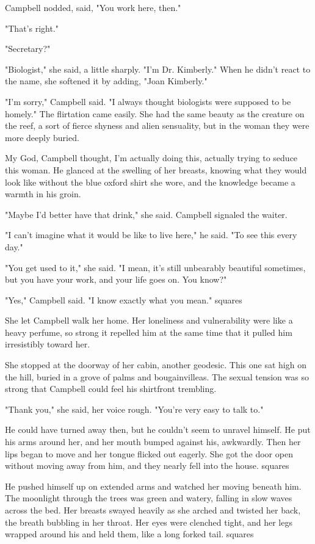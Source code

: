 Campbell nodded, said, "You work here, then."

"That's right."

"Secretary?"

"Biologist," she said, a little sharply. "I'm Dr. Kimberly." When he didn't react to the name, she softened it by adding, "Joan Kimberly."

"I'm sorry," Campbell said. "I always thought biologists were supposed to be homely." The flirtation came easily. She had the same beauty as the creature on the reef, a sort of fierce shyness and alien sensuality, but in the woman they were more deeply buried.

My God, Campbell thought, I'm actually doing this, actually trying to seduce this woman. He glanced at the swelling of her breasts, knowing what they would look like without the blue oxford shirt she wore, and the knowledge became a warmth in his groin.

"Maybe I'd better have that drink," she said. Campbell signaled the waiter.

"I can't imagine what it would be like to live here," he said. "To see this every day."

"You get used to it," she said. "I mean, it's still unbearably beautiful sometimes, but you have your work, and your life goes on. You know?"

"Yes," Campbell said. "I know exactly what you mean."
squares

She let Campbell walk her home. Her loneliness and vulnerability were like a heavy perfume, so strong it repelled him at the same time that it pulled him irresistibly toward her.

She stopped at the doorway of her cabin, another geodesic. This one sat high on the hill, buried in a grove of palms and bougainvilleas. The sexual tension was so strong that Campbell could feel his shirtfront trembling.

"Thank you," she said, her voice rough. "You're very easy to talk to."

He could have turned away then, but he couldn't seem to unravel himself. He put his arms around her, and her mouth bumped against his, awkwardly. Then her lips began to move and her tongue flicked out eagerly. She got the door open without moving away from him, and they nearly fell into the house.
squares

He pushed himself up on extended arms and watched her moving beneath him. The moonlight through the trees was green and watery, falling in slow waves across the bed. Her breasts swayed heavily as she arched and twisted her back, the breath bubbling in her throat. Her eyes were clenched tight, and her legs wrapped around his and held them, like a long forked tail.
squares

